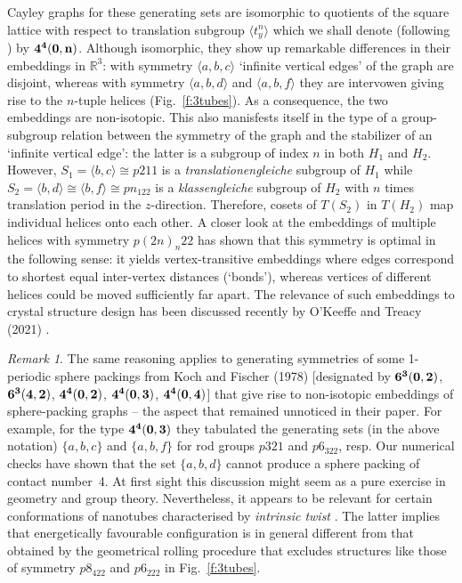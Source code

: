 \documentclass[11pt,a4paper]{article}
\newcommand{\R}{\mathbb R}
\begin{document}
\noindent Cayley graphs for these generating sets are isomorphic to quotients of the square lattice with respect to translation subgroup $\langle t_{y}^{n} \rangle$ which we shall denote (following \cite{KF78}) by  $\bf 4^4(0, n)$. Although isomorphic, they show up remarkable differences in their embeddings in $\R^3$: with symmetry $\langle a, b, c \rangle$ `infinite vertical edges' of the graph are disjoint, whereas with symmetry $\langle a, b, d \rangle$ and $\langle a, b, f \rangle$ they are intervowen giving rise to the $n$-tuple helices (Fig.~\ref{f:3tubes}). As a consequence, the two embeddings are non-isotopic. This also manisfests itself in the type of a group-subgroup relation between the symmetry of the graph and the stabilizer of an `infinite vertical edge': the latter is a subgroup of index $n$ in both $H_1$ and $H_2$. However, $S_1 = \langle b, c\rangle \cong p211$ is a \emph{translationengleiche} subgroup of $H_1$ while $S_2 = \langle b, d\rangle \cong \langle b, f \rangle \cong pn_122$  is a \emph{klassengleiche} subgroup of $H_2$ with $n$ times translation period in the $z$-direction. Therefore, cosets of $T(S_2)$ in $T(H_2)$ map individual helices onto each other. A closer look at the embeddings of multiple helices with symmetry $p(2n)_n22$ has shown that this symmetry is optimal in the following sense: it yields vertex-transitive embeddings where edges correspond to shortest equal inter-vertex distances (`bonds'), whereas vertices of different helices could be moved sufficiently far apart. The relevance of such embeddings to crystal structure design has been discussed recently by O'Keeffe and Treacy (2021) \cite{OK21}. %

\medskip

\noindent \emph{Remark 1}. The same reasoning applies to generating symmetries of some 1-periodic sphere packings from Koch and Fischer (1978) [designated by $\bf 6^3(0,2)$, $\bf 6^3(4, 2)$, $\bf 4^4(0, 2)$, $\bf 4^4(0, 3)$, $\bf 4^4(0, 4)$] that give rise to non-isotopic embeddings of sphere-packing graphs -- the aspect that remained unnoticed in their paper. For example, for the type $\bf 4^4(0,3)$ they tabulated the generating sets (in the above notation) $\{a, b, c\}$ and $\{a, b, f\}$ for rod groups $p321$ and $p6_322$, resp. Our numerical checks have shown that the set $\{a, b, d\}$ cannot produce a sphere packing of contact number~4. At first sight this discussion might seem as a pure exercise in geometry and group theory. Nevertheless, it appears to be relevant for certain conformations of nanotubes characterised by \emph{intrinsic twist} \cite{Twist2012}. The latter implies that energetically favourable configuration is in general different from that obtained by the geometrical rolling procedure \cite{Evar09} that excludes structures like those of symmetry $p8_422$ and $p6_222$ in Fig.~\ref{f:3tubes}. %
\end{document}
